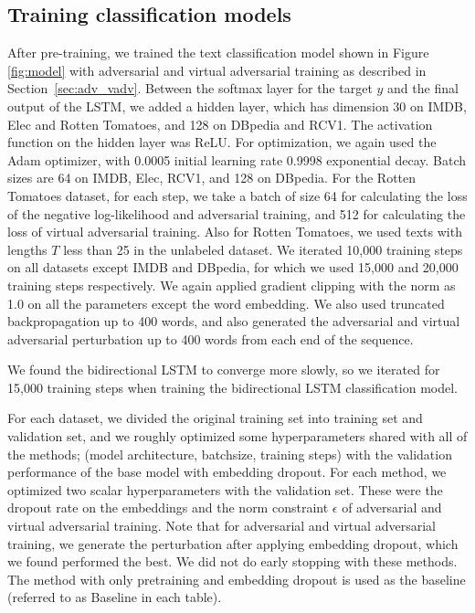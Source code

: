 \documentclass{article}
\begin{document}
\subsection{Training classification models}
After pre-training, we trained the text classification model shown in
Figure \ref{fig:model} with adversarial and virtual adversarial training as described in Section~\ref{sec:adv_vadv}.
Between the softmax layer for the target $y$ and the final output
of the LSTM, we added a hidden layer, which has dimension 30 on IMDB, Elec and Rotten Tomatoes, and 128 on
DBpedia and RCV1.
The activation function on the hidden layer was
ReLU\cite[]{jarrett2009best,nair2010rectified,glorot2011deep}.
For optimization, we again used the Adam optimizer, with 0.0005 initial learning rate 
0.9998 exponential decay. 
Batch sizes are 64 on IMDB, Elec, RCV1, and 128 on DBpedia.
For the Rotten Tomatoes dataset, for each step, we take a batch of size 64 for 
calculating the loss of the negative log-likelihood and adversarial training,
and 512 for calculating the loss of virtual adversarial training.
Also for Rotten Tomatoes, we used texts with lengths $T$ less than 25
in the unlabeled dataset.
We iterated 10,000 training steps on all datasets except IMDB and DBpedia, for which we used 15,000 
and 20,000 training steps respectively.
We again applied gradient clipping with the norm as 1.0 on all the parameters except the word embedding.
We also used truncated backpropagation up to 400 words, and also generated
the adversarial and virtual adversarial perturbation up to 400
words from each end of the sequence. 

We found the bidirectional LSTM to converge more slowly,
so we iterated for 15,000 training steps when training the bidirectional LSTM
classification model.

For each dataset, we divided the original training set into training set and
validation set, and we roughly optimized some hyperparameters shared with all of the methods;
(model architecture, batchsize, training steps)
with the validation performance of the base model with embedding dropout.
For each method, we optimized two scalar hyperparameters with the validation set.
These were the dropout rate on the embeddings and the norm constraint $\epsilon$ of adversarial and virtual
adversarial training. 
Note that for adversarial and virtual adversarial training, we generate the perturbation after applying embedding dropout, 
which we found performed the best.
We did not do early stopping with these methods.
The method with only pretraining and embedding dropout is used as the baseline
(referred to as Baseline in each table). 
 
\end{document}
